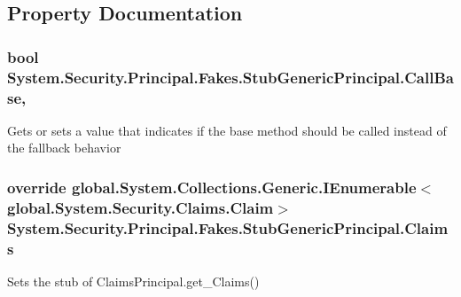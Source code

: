 \subsection{Property Documentation}
\hypertarget{class_system_1_1_security_1_1_principal_1_1_fakes_1_1_stub_generic_principal_a1cc5d2a168bacab0838acd6a0ab4c05a}{
\subsubsection[{Call\-Base}]{\setlength{\rightskip}{0pt plus 5cm}bool System.\-Security.\-Principal.\-Fakes.\-Stub\-Generic\-Principal.\-Call\-Base\hspace{0.3cm}{\ttfamily [get]}, {\ttfamily [set]}}}\label{class_system_1_1_security_1_1_principal_1_1_fakes_1_1_stub_generic_principal_a1cc5d2a168bacab0838acd6a0ab4c05a}


Gets or sets a value that indicates if the base method should be called instead of the fallback behavior

\hypertarget{class_system_1_1_security_1_1_principal_1_1_fakes_1_1_stub_generic_principal_a92a1907781448b8b384757b05f8ab33b}{
\subsubsection[{Claims}]{\setlength{\rightskip}{0pt plus 5cm}override global.\-System.\-Collections.\-Generic.\-I\-Enumerable$<$global.\-System.\-Security.\-Claims.\-Claim$>$ System.\-Security.\-Principal.\-Fakes.\-Stub\-Generic\-Principal.\-Claims\hspace{0.3cm}{\ttfamily [get]}}}\label{class_system_1_1_security_1_1_principal_1_1_fakes_1_1_stub_generic_principal_a92a1907781448b8b384757b05f8ab33b}


Sets the stub of Claims\-Principal.\-get\-\_\-\-Claims()


